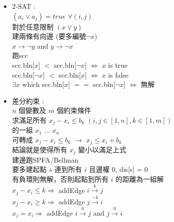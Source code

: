 \begin{itemize}
    \item 2-SAT :\\
     $(a_i \vee a_j) = true$ $ \forall (i,j) $ \\
     對於任意限制 $(x \vee y)$ \\
     建兩條有向邊 (要多編號$\neg x$)\\
     $x\rightarrow\neg y$ and $y\rightarrow\neg x$ \\
     跑scc\\
     scc.bln[$x$] $<$ scc.bln[$\neg x$] $\Leftrightarrow$ $x$ is true \\
     scc.bln[$\neg x$] $<$ scc.bln[$x$] $\Leftrightarrow$ $x$ is false \\
     $\exists x $ which scc.bln[$x$] $==$ scc.bln[$\neg x$] $\Leftrightarrow$ 無解\\
    \item 差分約束 :\\
    $n$ 個變數及 $m$ 個約束條件\\
    求滿足所有 $x_j - x_i \leq b_k$ $(i,j \in [1,n], k \in [1,m])$\\
    的一組 $x_1$ ... $x_n$ \\
    可轉成 $x_j - x_i \leq b_k$ $\rightarrow$ $x_j \leq x_i + b_k$ \\
    結論就是使得所有 $x_j$ 變小以滿足上式 \\
    建邊跑SPFA/Bellman  \\
    要多建起點 $s$ 連到所有 $i$ 且邊權 $0$, dis[s] = 0 \\
    有負環則無解，否則起點到所有 $i$ 的距離為一組解 \\
    $x_j - x_i \leq k \Rightarrow$ addEdge $i\stackrel{k}{\longrightarrow}j$ \\
    $x_j - x_i \geq k \Rightarrow$ addEdge $j\stackrel{-k}{\longrightarrow}i$ \\
    $x_j = x_i \Rightarrow$ addEdge $i\stackrel{0}{\longrightarrow}j$ and $j\stackrel{0}{\longrightarrow}i$ \\
\end{itemize}